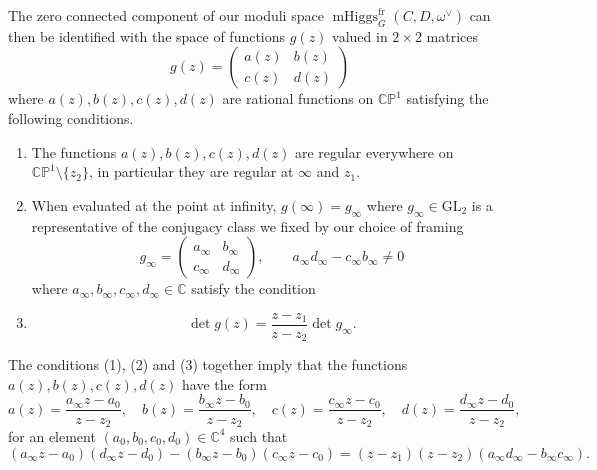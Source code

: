 \documentclass[11pt, oneside, reqno]{amsart}
\theoremstyle{definition} \newtheorem{definition}{Definition}[section]
\theoremstyle{definition} \newtheorem{remark}[definition]{Remark}
\theoremstyle{definition} \newtheorem{remarks}[definition]{Remarks}
\theoremstyle{definition} \newtheorem{question}[definition]{Question}
\theoremstyle{definition} \newtheorem*{note}{Note}
\theoremstyle{definition} \newtheorem{example}[definition]{Example}
\theoremstyle{definition} \newtheorem{examples}[definition]{Examples}
\newcommand{\bb}[1]{\mathbb{#1}}
\newcommand{\CC}{\mathbb{C}}
\newcommand{\GL}{\mathrm{GL}}
\DeclareMathOperator{\mhiggs}{mHiggs}
\newcommand{\fr}{\mathrm{fr}}
\begin{document}
The zero connected component of our moduli space  $\mhiggs_{G}^\fr(C, D, \omega^{\vee})$ can then be identified with the space of functions $g(z)$ valued in $2 \times 2$ matrices 
   \begin{equation*}
     g(z) =
     \begin{pmatrix}
       a(z) & b(z) \\
       c(z) & d(z)
     \end{pmatrix}
   \end{equation*}
   where $a(z), b(z), c(z), d(z)$ are rational functions on $\bb{CP}^1$ satisfying the following conditions. 
   \begin{enumerate}
   \item The functions $a(z), b(z), c(z), d(z)$ are regular everywhere on $\bb{CP}^1 \setminus \{z_2\}$,
     in particular they are regular at $\infty$ and $z_1$.
   \item When evaluated at the point at infinity, $g(\infty) = g_\infty$ where $g_\infty \in \GL_2$ is a representative of the conjugacy class we fixed by our choice of framing
     \begin{equation*}
       g_\infty =
       \begin{pmatrix}
         a_\infty & b_\infty \\
         c_\infty & d_\infty 
       \end{pmatrix}, \qquad a_\infty d_\infty - c_\infty b_\infty \neq 0 
     \end{equation*}
where $a_\infty, b_\infty, c_\infty, d_\infty \in \CC$  satisfy the condition
   \item
     \begin{equation*}
       \det g(z) =  \frac{ z- z_1}{ z - z_2}  \det g_\infty.
     \end{equation*}
   \end{enumerate}
 
   The conditions (1), (2) and (3) together imply that the functions $a(z), b(z), c(z), d(z)$ have the form
   \begin{equation*}
     a(z) =  \frac{a_\infty z  - a_0}{z - z_2},\quad
     b(z) = \frac{ b_\infty z  - b_0}{z - z_2},\quad
     c(z) = \frac{ c_\infty  z  - c_0}{z - z_2},\quad
     d(z) = \frac{d_\infty  z  - d_0}{z - z_2},
   \end{equation*}
for an element $(a_0, b_0, c_0, d_0) \in \CC^4$ such that
   \begin{equation*}
 (a_\infty z - a_0)( d_\infty z - d_0) -   (b_\infty z - b_0)(c_\infty z -c_0) =
     (z - z_1)(z- z_2) (a_\infty d_\infty - b_\infty c_\infty).
   \end{equation*}
\end{document}
